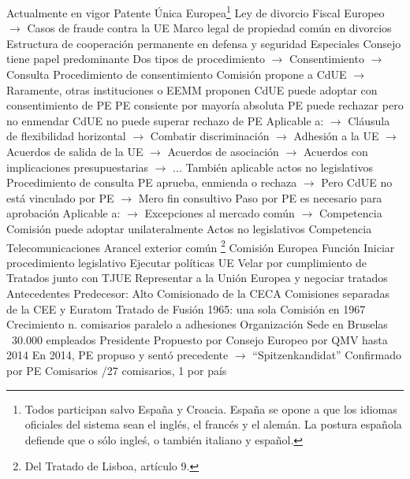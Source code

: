 \documentclass{nuevotema}
\begin{document}
\begin{esquemal}
				\4 Actualmente en vigor
				\4[] Patente Única Europea\footnote{Todos participan salvo España y Croacia. España se opone a que los idiomas oficiales del sistema sean el inglés, el francés y el alemán. La postura española defiende que o sólo ingleś, o también italiano y español.}
				\4[] Ley de divorcio
				\4[] Fiscal Europeo
				\4[] $\to$ Casos de fraude contra la UE
				\4[] Marco legal de propiedad común en divorcios
				\4[] Estructura de cooperación permanente en defensa y seguridad
			\3 Especiales
				\4 Consejo tiene papel predominante
				\4 Dos tipos de procedimiento
				\4[] $\to$ Consentimiento
				\4[] $\to$ Consulta
				\4 Procedimiento de consentimiento
				\4[] Comisión propone a CdUE
				\4[] $\to$ Raramente, otras instituciones o EEMM proponen
				\4[] CdUE puede adoptar con consentimiento de PE
				\4[] PE consiente por mayoría absoluta
				\4[] PE puede rechazar pero no enmendar
				\4[] CdUE no puede superar rechazo de PE
				\4[] Aplicable a:
				\4[] $\to$ Cláusula de flexibilidad horizontal
				\4[] $\to$ Combatir discriminación
				\4[] $\to$ Adhesión a la UE
				\4[] $\to$ Acuerdos de salida de la UE
				\4[] $\to$ Acuerdos de asociación
				\4[] $\to$ Acuerdos con implicaciones presupuestarias
				\4[] $\to$ ...
				\4[] También aplicable actos no legislativos
				\4 Procedimiento de consulta
				\4[] PE aprueba, enmienda o rechaza
				\4[] $\to$ Pero CdUE no está vinculado por PE
				\4[] $\to$ Mero fin consultivo
				\4[] Paso por PE es necesario para aprobación
				\4[] Aplicable a:
				\4[] $\to$ Excepciones al mercado común
				\4[] $\to$ Competencia
				\4 Comisión puede adoptar unilateralmente
				\4[] Actos no legislativos
				\4[] Competencia
				\4[] Telecomunicaciones
				\4[] Arancel exterior común
	\1 \footnote{Del Tratado de Lisboa, artículo 9.}
		\2 Comisión Europea
			\3 Función
				\4 Iniciar procedimiento legislativo
				\4 Ejecutar políticas UE
				\4 Velar por cumplimiento de Tratados junto con TJUE
				\4 Representar a la Unión Europea y negociar tratados
			\3 Antecedentes
				\4 Predecesor: Alto Comisionado de la CECA
				\4 Comisiones separadas de la CEE y Euratom
				\4 Tratado de Fusión 1965: una sola Comisión en 1967
				\4 Crecimiento n. comisarios paralelo a adhesiones
			\3 Organización
				\4 Sede en Bruselas
				\4 ~30.000 empleados
				\4 Presidente
				\4[] Propuesto por Consejo Europeo por QMV hasta 2014
				\4[] En 2014, PE propuso y sentó precedente
				\4[] $\to$ ``Spitzenkandidat''
				\4[] Confirmado por PE
				\4 Comisarios
				/27 comisarios, 1 por país

\end{esquemal}
\end{document}
